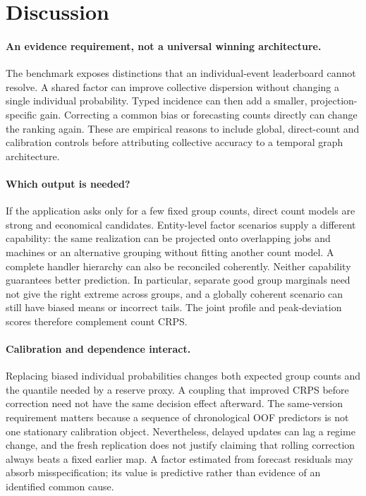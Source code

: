 \section{Discussion}
\paragraph{An evidence requirement, not a universal winning architecture.}
The benchmark exposes distinctions that an individual-event leaderboard
cannot resolve. A shared factor can improve collective dispersion without
changing a single individual probability. Typed incidence can then add a
smaller, projection-specific gain. Correcting a common bias or forecasting
counts directly can change the ranking again. These are empirical reasons to
include global, direct-count and calibration controls before attributing
collective accuracy to a temporal graph architecture.

\paragraph{Which output is needed?}
If the application asks only for a few fixed group counts, direct count models
are strong and economical candidates. Entity-level factor scenarios supply a
different capability: the same realization can be projected onto overlapping
jobs and machines or an alternative grouping without fitting another count
model. A complete handler hierarchy can also be reconciled coherently. Neither
capability guarantees better prediction. In particular, separate good group
marginals need not give the right extreme across groups, and a globally
coherent scenario can still have biased means or incorrect tails. The joint
profile and peak-deviation scores therefore complement count CRPS.

\paragraph{Calibration and dependence interact.}
Replacing biased individual probabilities changes both expected group counts
and the quantile needed by a reserve proxy. A coupling that improved CRPS
before correction need not have the same decision effect afterward. The
same-version requirement matters because a sequence of chronological OOF
predictors is not one stationary calibration object. Nevertheless, delayed
updates can lag a regime change, and the fresh replication does not justify
claiming that rolling correction always beats a fixed earlier map. A factor
estimated from forecast residuals may absorb misspecification; its value is
predictive rather than evidence of an identified common cause.

